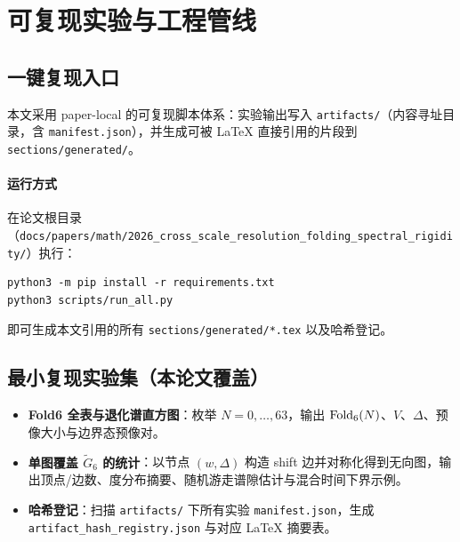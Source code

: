 \section{可复现实验与工程管线}\label{sec:reproducibility}

\subsection{一键复现入口}
本文采用 paper-local 的可复现脚本体系：实验输出写入 \texttt{artifacts/}（内容寻址目录，含 \texttt{manifest.json}），并生成可被 \LaTeX{} 直接引用的片段到 \texttt{sections/generated/}。

\paragraph{运行方式}
在论文根目录（\texttt{docs/papers/math/2026\_cross\_scale\_resolution\_folding\_spectral\_rigidity/}）执行：
\begin{verbatim}
python3 -m pip install -r requirements.txt
python3 scripts/run_all.py
\end{verbatim}
即可生成本文引用的所有 \texttt{sections/generated/*.tex} 以及哈希登记。

\subsection{最小复现实验集（本论文覆盖）}
\begin{itemize}
  \item \textbf{Fold6 全表与退化谱直方图}：枚举 $N=0,\dots,63$，输出 $\mathrm{Fold}_6(N)$、$V$、$\Delta$、预像大小与边界态预像对。
  \item \textbf{单图覆盖 $\widetilde G_6$ 的统计}：以节点 $(w,\Delta)$ 构造 shift 边并对称化得到无向图，输出顶点/边数、度分布摘要、随机游走谱隙估计与混合时间下界示例。
  \item \textbf{哈希登记}：扫描 \texttt{artifacts/} 下所有实验 \texttt{manifest.json}，生成 \texttt{artifact\_hash\_registry.json} 与对应 \LaTeX{} 摘要表。
\end{itemize}

